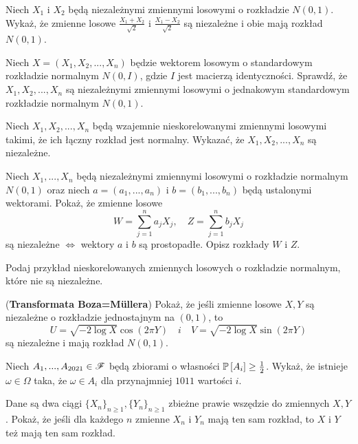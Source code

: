 \documentclass{article}
\begin{document}
\begin{problem}{}
Niech $X_1$ i $X_2$ będą niezależnymi zmiennymi losowymi o rozkładzie $N(0,1)$. Wykaż, że zmienne losowe $\frac{X_1+X_2}{\sqrt{2}}$ i $\frac{X_1-X_2}{\sqrt{2}}$ są niezależne i obie mają rozkład $N(0,1)$.
\end{problem}

\begin{problem}{}
Niech $X=(X_1,X_2,...,X_n)$ będzie wektorem losowym o standardowym rozkładzie normalnym $N(0,I)$, gdzie $I$ jest macierzą identyczności. Sprawdź, że $X_1,X_2,...,X_n$ są niezależnymi zmiennymi losowymi o jednakowym standardowym rozkładzie normalnym $N(0,1)$.
\end{problem}

\begin{problem}{}
Niech $X_1,X_2,...,X_n$ będą wzajemnie nieskorelowanymi zmiennymi losowymi takimi, że ich łączny rozkład jest normalny. Wykazać, że $X_1,X_2,...,X_n$ są niezależne.
\end{problem}

\begin{problem}{}
Niech $X_1,...,X_n$ będą niezależnymi zmiennymi losowymi o rozkładzie normalnym $N(0,1)$ oraz niech $a=(a_1,...,a_n)$ i $b=(b_1,...,b_n)$ będą ustalonymi wektorami. Pokaż, że zmienne losowe
$$W=\sum_{j=1}^na_jX_j,\quad Z=\sum_{j=1}^n b_jX_j$$
są niezależne $\iff$ wektory $a$ i $b$ są prostopadłe. Opisz rozkłady $W$ i $Z$.
\end{problem}

\begin{problem}{}
Podaj przykład nieskorelowanych zmiennych losowych o rozkładzie normalnym, które nie są niezależne.
\end{problem}

\begin{problem}{}
(\textbf{Transformata Boza=M\"ullera}) Pokaż, że jeśli zmienne losowe $X,Y$ są niezależne o rozkładzie jednostajnym na $(0,1)$, to
$$U=\sqrt{-2\log X}\cos(2\pi Y) \quad i\quad V=\sqrt{-2\log X}\sin(2\pi Y)$$
są niezależne i mają rozkład $N(0,1)$.
\end{problem}

\begin{problem}{}
Niech $A_1,...,A_{2021}\in\mathcal{F}$ będą zbiorami o własności $\prob{A_i}\geq\frac{1}{2}$. Wykaż, że istnieje $\omega\in\Omega$ taka, że $\omega\in A_i$ dla przynajmniej $1011$ wartości $i$.
\end{problem}

\begin{problem}{}
Dane są dwa ciągi $\{X_n\}_{n\geq1},\{Y_n\}_{n\geq 1}$ zbieżne prawie wszędzie do zmiennych $X,Y$. Pokaż, że jeśli dla każdego $n$ zmienne $X_n$ i $Y_n$ mają ten sam rozkład, to $X$ i $Y$ też mają ten sam rozkład.
\end{problem}
\end{document}
